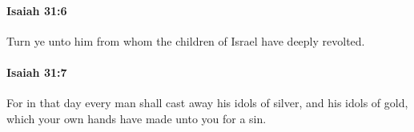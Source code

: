 		\paragraph{Isaiah 31:6} %
			\label{ISAIAH-31-6}

			Turn ye unto him from whom the children of Israel have deeply revolted.


		\paragraph{Isaiah 31:7} %
			\label{ISAIAH-31-7}

			For in that day every man shall cast away his idols of silver, and his idols of gold, which your own hands have made unto you for a sin.


